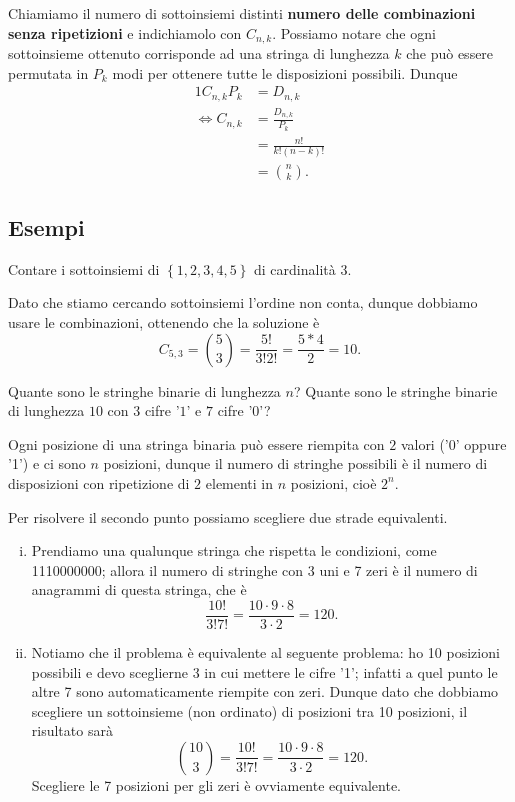 Chiamiamo il numero di sottoinsiemi distinti \textbf{numero delle combinazioni senza ripetizioni} e indichiamolo con $C_{n, k}$. Possiamo notare che ogni sottoinsieme ottenuto corrisponde ad una stringa di lunghezza $k$ che può essere permutata in $P_k$ modi per ottenere tutte le disposizioni possibili. Dunque \begin{alignat*}
    {1}
    C_{n, k}P_k   &= D_{n, k}  \\
    \iff C_{n, k} &= \frac{D_{n,k}}{P_k}\\
                  &= \frac{n!}{k!(n-k)!} \\
                  &= \binom{n}{k}.
\end{alignat*}

\subsection{Esempi}

\begin{example}
    Contare i sottoinsiemi di $\left\{ 1, 2, 3, 4, 5\right\}$ di cardinalità $3$.
\end{example}
\begin{solution}
    Dato che stiamo cercando sottoinsiemi l'ordine non conta, dunque dobbiamo usare le combinazioni, ottenendo che la soluzione è \[
        C_{5, 3} = \binom{5}{3} =  \frac{5!}{3!2!} = \frac{5*4}{2} = 10
    .\]
\end{solution}

\begin{example}
    Quante sono le stringhe binarie di lunghezza $n$? Quante sono le stringhe binarie di lunghezza $10$ con $3$ cifre '$1$' e $7$ cifre '$0$'?
\end{example}
\begin{solution}
    Ogni posizione di una stringa binaria può essere riempita con $2$ valori ('0' oppure '1') e ci sono $n$ posizioni, dunque il numero di stringhe possibili è il numero di disposizioni con ripetizione di $2$ elementi in $n$ posizioni, cioè $2^n$.

    Per risolvere il secondo punto possiamo scegliere due strade equivalenti.
    \begin{enumerate}[(i)]
        \item Prendiamo una qualunque stringa che rispetta le condizioni, come 1110000000; allora il numero di stringhe con 3 uni e 7 zeri è il numero di anagrammi di questa stringa, che è \[
            \frac{10!}{3!7!} = \frac{10 \cdot 9 \cdot 8}{3 \cdot 2} = 120.   
        \]
        \item Notiamo che il problema è equivalente al seguente problema: ho 10 posizioni possibili e devo sceglierne 3 in cui mettere le cifre '1'; infatti a quel punto le altre 7 sono automaticamente riempite con zeri. Dunque dato che dobbiamo scegliere un sottoinsieme (non ordinato) di posizioni tra 10 posizioni, il risultato sarà \[
            \binom{10}{3} = \frac{10!}{3!7!} = \frac{10 \cdot 9 \cdot 8}{3 \cdot 2} = 120.   
        \]
        Scegliere le 7 posizioni per gli zeri è ovviamente equivalente.
    \end{enumerate}
\end{solution}

